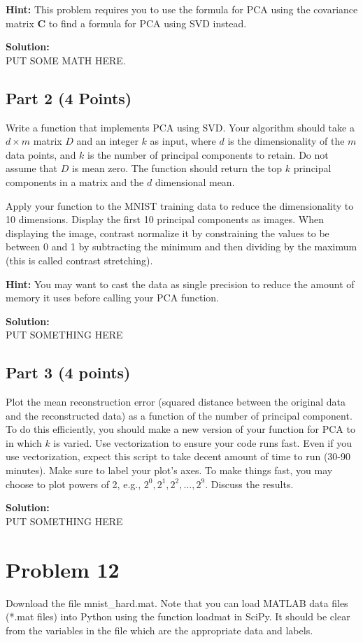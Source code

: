\documentclass[11pt, oneside]{article}   	%
\begin{document}
\textbf{Hint:} This problem requires you to use the formula for PCA using the covariance matrix $\mathbf{C}$ to find a formula for PCA using SVD instead.

\textbf{Solution:}\\
PUT SOME MATH HERE.

\subsection*{Part 2 (4 Points)}
Write a function that implements PCA using SVD. Your algorithm should take a $d \times m$ matrix $D$ and an integer $k$ as input, where $d$ is the dimensionality of the $m$ data points, and $k$ is the number of principal components to retain. Do not assume that $D$ is mean zero. The function should return the top $k$ principal components in a matrix and the $d$ dimensional mean. 

Apply your function to the MNIST training data to reduce the dimensionality to 10 dimensions. Display the first 10 principal components as images. When displaying the image, contrast normalize it by constraining the values to be between 0 and 1 by subtracting the minimum and then dividing by the maximum (this is called contrast stretching). 

\textbf{Hint:} You may want to cast the data as single precision to reduce the amount of memory it uses before calling your PCA function. 

\textbf{Solution:}\\
PUT SOMETHING HERE 

\subsection*{Part 3 (4 points)}
Plot the mean reconstruction error (squared distance between the original data and the reconstructed data) as a function of the number of principal component. To do this efficiently, you should make a new version of your function for PCA to in which $k$ is varied. Use vectorization to ensure your code runs fast. Even if you use vectorization, expect this script to take decent amount of time to run (30-90 minutes). Make sure to label your plot's axes.  To make things fast, you may choose to plot powers of 2, e.g., $2^0, 2^1, 2^2,\ldots, 2^9$. Discuss the results.

\textbf{Solution:}\\
PUT SOMETHING HERE 

\section*{Problem 12}
Download the file mnist\_hard.mat. Note that you can load MATLAB data files (*.mat files) into Python using the function loadmat in SciPy. It should be clear from the variables in the file which are the appropriate data and labels.
\end{document}
